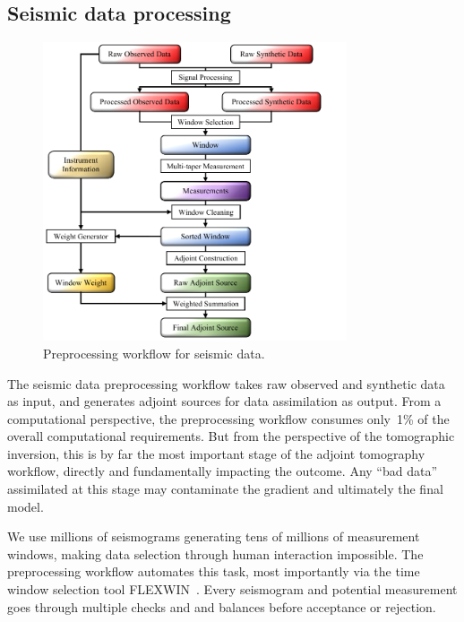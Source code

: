 \documentclass[extra,mreferee]{gji}
\begin{document}
\subsection{Seismic data processing}

\begin{figure}
  \centering
  \includegraphics[width=0.8\textwidth]{figures/Preprocess_workflow.pdf}
  \caption{Preprocessing workflow for seismic data.}
  \label{fig:preprocess_workflow}
\end{figure}

The seismic data preprocessing workflow takes raw observed and synthetic data as input,
and generates adjoint sources for data assimilation as output.
From a computational perspective, the preprocessing workflow consumes only~1\% of the overall computational requirements.
But from the perspective of the tomographic inversion, this is by far the most important stage of the adjoint tomography workflow,
directly and fundamentally impacting the outcome.
Any ``bad data'' assimilated at this stage may contaminate the gradient and ultimately the final model.

We use millions of seismograms generating tens of millions of measurement windows,
making data selection through human interaction impossible.
The preprocessing workflow automates this task,
most importantly via the time window selection tool FLEXWIN~\citep{maggi2009automated}.
Every seismogram and potential measurement goes through multiple checks and and balances before acceptance or rejection.
\end{document}
